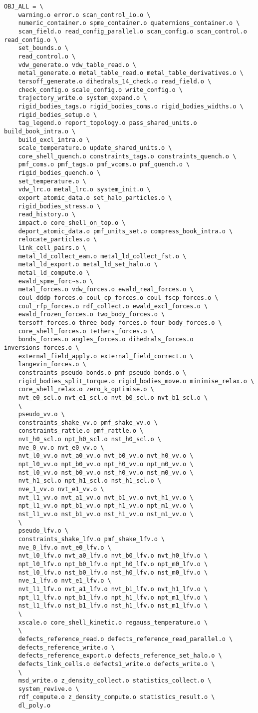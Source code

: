 \begin{verbatim}
OBJ_ALL = \
	warning.o error.o scan_control_io.o \
	numeric_container.o spme_container.o quaternions_container.o \
	scan_field.o read_config_parallel.o scan_config.o scan_control.o read_config.o \
	set_bounds.o \
	read_control.o \
	vdw_generate.o vdw_table_read.o \
	metal_generate.o metal_table_read.o metal_table_derivatives.o \
	tersoff_generate.o dihedrals_14_check.o read_field.o \
	check_config.o scale_config.o write_config.o \
	trajectory_write.o system_expand.o \
	rigid_bodies_tags.o rigid_bodies_coms.o rigid_bodies_widths.o \
	rigid_bodies_setup.o \
	tag_legend.o report_topology.o pass_shared_units.o build_book_intra.o \
	build_excl_intra.o \
	scale_temperature.o update_shared_units.o \
	core_shell_quench.o constraints_tags.o constraints_quench.o \
	pmf_coms.o pmf_tags.o pmf_vcoms.o pmf_quench.o \
	rigid_bodies_quench.o \
	set_temperature.o \
	vdw_lrc.o metal_lrc.o system_init.o \
	export_atomic_data.o set_halo_particles.o \
	rigid_bodies_stress.o \
	read_history.o \
	impact.o core_shell_on_top.o \
	deport_atomic_data.o pmf_units_set.o compress_book_intra.o \
	relocate_particles.o \
	link_cell_pairs.o \
	metal_ld_collect_eam.o metal_ld_collect_fst.o \
	metal_ld_export.o metal_ld_set_halo.o \
	metal_ld_compute.o \
	ewald_spme_forc~s.o \
	metal_forces.o vdw_forces.o ewald_real_forces.o \
	coul_dddp_forces.o coul_cp_forces.o coul_fscp_forces.o \
	coul_rfp_forces.o rdf_collect.o ewald_excl_forces.o \
	ewald_frozen_forces.o two_body_forces.o \
	tersoff_forces.o three_body_forces.o four_body_forces.o \
	core_shell_forces.o tethers_forces.o \
	bonds_forces.o angles_forces.o dihedrals_forces.o inversions_forces.o \
	external_field_apply.o external_field_correct.o \
	langevin_forces.o \
	constraints_pseudo_bonds.o pmf_pseudo_bonds.o \
	rigid_bodies_split_torque.o rigid_bodies_move.o minimise_relax.o \
	core_shell_relax.o zero_k_optimise.o \
	nvt_e0_scl.o nvt_e1_scl.o nvt_b0_scl.o nvt_b1_scl.o \
	\
	pseudo_vv.o \
	constraints_shake_vv.o pmf_shake_vv.o \
	constraints_rattle.o pmf_rattle.o \
	nvt_h0_scl.o npt_h0_scl.o nst_h0_scl.o \
	nve_0_vv.o nvt_e0_vv.o \
	nvt_l0_vv.o nvt_a0_vv.o nvt_b0_vv.o nvt_h0_vv.o \
	npt_l0_vv.o npt_b0_vv.o npt_h0_vv.o npt_m0_vv.o \
	nst_l0_vv.o nst_b0_vv.o nst_h0_vv.o nst_m0_vv.o \
	nvt_h1_scl.o npt_h1_scl.o nst_h1_scl.o \
	nve_1_vv.o nvt_e1_vv.o \
	nvt_l1_vv.o nvt_a1_vv.o nvt_b1_vv.o nvt_h1_vv.o \
	npt_l1_vv.o npt_b1_vv.o npt_h1_vv.o npt_m1_vv.o \
	nst_l1_vv.o nst_b1_vv.o nst_h1_vv.o nst_m1_vv.o \
	\
	pseudo_lfv.o \
	constraints_shake_lfv.o pmf_shake_lfv.o \
	nve_0_lfv.o nvt_e0_lfv.o \
	nvt_l0_lfv.o nvt_a0_lfv.o nvt_b0_lfv.o nvt_h0_lfv.o \
	npt_l0_lfv.o npt_b0_lfv.o npt_h0_lfv.o npt_m0_lfv.o \
	nst_l0_lfv.o nst_b0_lfv.o nst_h0_lfv.o nst_m0_lfv.o \
	nve_1_lfv.o nvt_e1_lfv.o \
	nvt_l1_lfv.o nvt_a1_lfv.o nvt_b1_lfv.o nvt_h1_lfv.o \
	npt_l1_lfv.o npt_b1_lfv.o npt_h1_lfv.o npt_m1_lfv.o \
	nst_l1_lfv.o nst_b1_lfv.o nst_h1_lfv.o nst_m1_lfv.o \
	\
	xscale.o core_shell_kinetic.o regauss_temperature.o \
	\
	defects_reference_read.o defects_reference_read_parallel.o \
	defects_reference_write.o \
	defects_reference_export.o defects_reference_set_halo.o \
	defects_link_cells.o defects1_write.o defects_write.o \
	\
	msd_write.o z_density_collect.o statistics_collect.o \
	system_revive.o \
	rdf_compute.o z_density_compute.o statistics_result.o \
	dl_poly.o


\end{verbatim}

